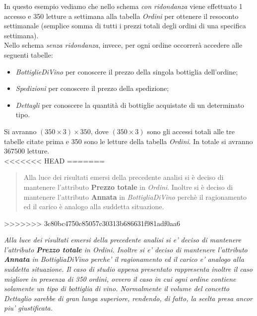 \begin{flushleft}
In questo esempio vediamo che nello schema \emph{con ridondanza} viene effettuato 1 accesso e 350 letture a settimana alla tabella \emph{Ordini} per ottenere il resoconto settimanale (semplice somma di tutti i prezzi totali degli ordini di una specifica settimana).\\
\vspace{0.5cm}
Nello schema \emph{senza ridondanza}, invece, per ogni ordine occorrerà accedere alle seguenti tabelle:
\begin{itemize}
	\item \emph{BottiglieDiVino} per conoscere il prezzo della singola bottiglia dell'ordine;
	\item \emph{Spedizioni} per conoscere il prezzo della spedizione;
	\item \emph{Dettagli} per conoscere la quantità di bottiglie acquistate di un determinato tipo.
\end{itemize}
Si avranno $(350\times3)\times350$, dove $(350\times3)$ sono gli accessi totali alle tre tabelle citate prima e 350 sono le letture della tabella \emph{Ordini}. In totale si avranno $367500$ letture.\\
<<<<<<< HEAD
=======
\begin{verse}
	Alla luce dei risultati emersi della precedente analisi si è deciso di mantenere l'attributo \textbf{Prezzo totale} in \emph{Ordini}. Inoltre si è deciso di mantenere l'attributo \textbf{Annata} in \emph{BottigliaDiVino} perchè il ragionamento ed il carico è analogo alla suddetta situazione.
\end{verse} 
>>>>>>> 3c80bc4750c85057c30313b686631f981adf0aa6
\end{flushleft}
\emph{
	Alla luce dei risultati emersi della precedente analisi si e' deciso di mantenere l'attributo \textbf{Prezzo totale} in \emph{Ordini}. Inoltre si e' deciso di mantenere l'attributo \textbf{Annata} in \emph{BottigliaDiVino} perche' il ragionamento ed il carico e' analogo alla suddetta situazione. Il caso di studio appena presentato rappresenta inoltre il caso migliore in presenza di 350 ordini, ovvero il caso in cui ogni ordine contiene solamente un tipo di bottiglia di vino. Normalmente il volume del concetto \emph{Dettaglio} sarebbe di gran lunga superiore, rendendo, di fatto, la scelta presa ancor piu' giustificata.
}
